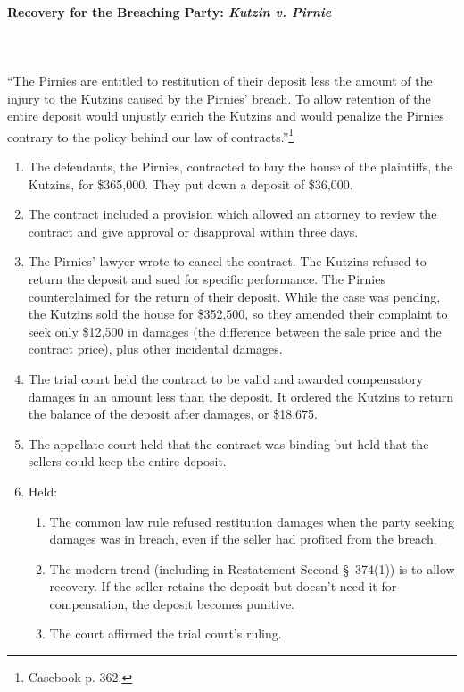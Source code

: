 \paragraph{Recovery for the Breaching Party: \emph{Kutzin v. Pirnie}}
~\\\\
``The Pirnies are entitled to restitution of their deposit less the amount of 
the injury to the Kutzins caused by the Pirnies' breach. To allow retention of 
the entire deposit would unjustly enrich the Kutzins and would penalize the 
Pirnies contrary to the policy behind our law of 
contracts.''\footnote{Casebook p. 362.}

\begin{enumerate}
    \item The defendants, the Pirnies, contracted to buy the house of the 
    plaintiffs, the Kutzins, for \$365,000. They put down a deposit of 
    \$36,000.
    \item The contract included a provision which allowed an attorney to 
    review the contract and give approval or disapproval within three days.
    \item The Pirnies' lawyer wrote to cancel the contract. The Kutzins 
    refused to return the deposit and sued for specific performance. The 
    Pirnies counterclaimed for the return of their deposit. While the case 
    was pending, the Kutzins sold the house for \$352,500, so they amended 
    their complaint to seek only \$12,500 in damages (the difference between 
    the sale price and the contract price), plus other incidental damages.
    \item The trial court held the contract to be valid and awarded
    compensatory damages in an amount less than the deposit. It ordered the 
    Kutzins to return the balance of the deposit after damages, or \$18.675.
    \item The appellate court held that the contract was binding but held that 
    the sellers could keep the entire deposit.
    \item Held:
    \begin{enumerate}
        \item The common law rule refused restitution damages when the party 
        seeking damages was in breach, even if the seller had profited from 
        the breach.
        \item The modern trend (including in Restatement Second \S\ 374(1)) is 
        to allow recovery. If the seller retains the deposit but doesn't need 
        it for compensation, the deposit becomes punitive.
        \item The court affirmed the trial court's ruling.
    \end{enumerate}
\end{enumerate}

